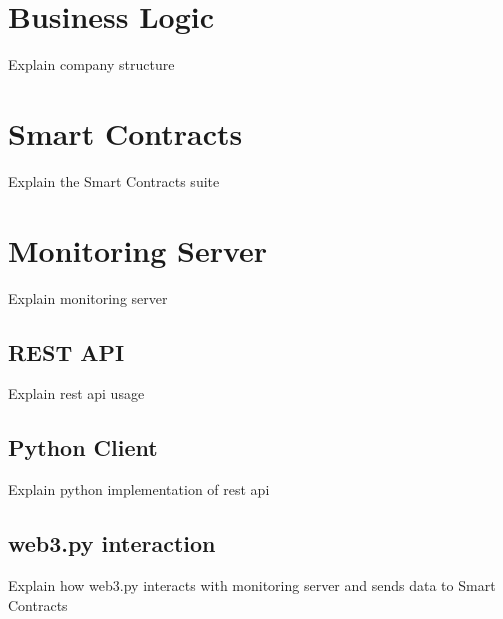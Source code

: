 \section{Business Logic}
Explain company structure

\section{Smart Contracts}
Explain the Smart Contracts suite



\section{Monitoring Server}
Explain monitoring server
\subsection{REST API} 
Explain rest api usage 
\subsection{Python Client}
Explain python implementation of rest api
\subsection{web3.py interaction}
Explain how web3.py interacts with monitoring server and sends data to Smart Contracts
